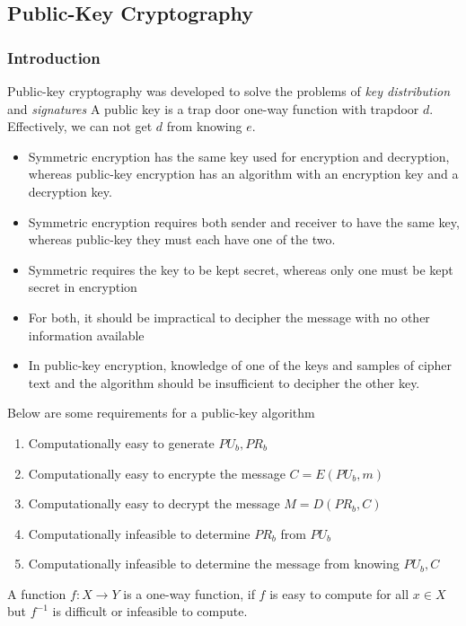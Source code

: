 \documentclass[11pt]{article}
\begin{document}
\subsection{Public-Key Cryptography}
\subsubsection{Introduction}
Public-key cryptography was developed to solve the problems of \textit{key distribution} and \textit{signatures}
A public key is a trap door one-way function with trapdoor $d$.
Effectively, we can not get $d$ from knowing $e$.
\begin{itemize}
    \item Symmetric encryption has the same key used for encryption and decryption, whereas public-key encryption has an algorithm with an encryption key and a decryption key.
    \item Symmetric encryption requires both sender and receiver to have the same key, whereas public-key they must each have one of the two.
    \item Symmetric requires the key to be kept secret, whereas only one must be kept secret in encryption
    \item For both, it should be impractical to decipher the message with no other information available
    \item In public-key encryption, knowledge of one of the keys and samples of cipher text and the algorithm should be insufficient to decipher the other key.
\end{itemize}

Below are some requirements for a public-key algorithm
\begin{enumerate}
    \item Computationally easy to generate $PU_b, PR_b$
    \item Computationally easy to encrypte the message $C=E(PU_b,m)$
    \item Computationally easy to decrypt the message $M=D(PR_b,C)$
    \item Computationally infeasible to determine $PR_b$ from $PU_b$
    \item Computationally infeasible to determine the message from knowing $PU_b,C$
\end{enumerate}

A function $f : X \rightarrow Y$ is a one-way function, if $f$ is easy to compute for all $x \in X$ but $f^{-1}$ is difficult or infeasible to compute.
\end{document}
